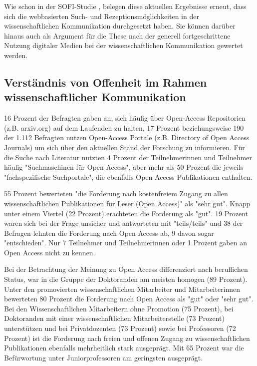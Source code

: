 Wie schon in der SOFI-Studie \cite{Hanekop_2014}, belegen diese aktuellen Ergebnisse erneut, dass sich die webbasierten Such- und Rezeptionsmöglichkeiten in der wissenschaftlichen Kommunikation durchgesetzt haben. Sie können darüber hinaus auch als Argument für die These nach der generell fortgeschrittene Nutzung digitaler Medien bei der wissenschaftlichen Kommunikation gewertet werden.

\subsection{Verständnis von Offenheit im Rahmen wissenschaftlicher Kommunikation}

16 Prozent der Befragten gaben an, sich häufig über Open-Access Repositorien (z.B. arxiv.org) auf dem Laufenden zu halten, 17 Prozent beziehungsweise 190 der 1.112 Befragten nutzen Open-Access Portale (z.B. Directory of Open Access Journals) um sich über den aktuellen Stand der Forschung zu informieren. Für die Suche nach Literatur nutzten 4 Prozent der Teilnehmerinnen und Teilnehmer häufig "Suchmaschinen für Open Access", aber mehr als 50 Prozent die jeweils "fachspezifische Suchportale", die ebenfalls Open-Access Publikationen enthalten.

55 Prozent bewerteten "die Forderung nach kostenfreiem Zugang zu allen wissenschaftlichen Publikationen für Leser (Open Access)" als "sehr gut". Knapp unter einem Viertel (22 Prozent) erachteten die Forderung als "gut". 19 Prozent waren sich bei der Frage unsicher und antworteten mit "teils/teils" und 38 der Befragen lehnten die Forderung nach Open Access ab, 9 davon sogar "entschieden". Nur 7 Teilnehmer und Teilnehmerinnen oder 1 Prozent gaben an Open Access nicht zu kennen.

Bei der Betrachtung der Meinung zu Open Access differenziert nach beruflichen Status, war in die Gruppe der Doktoranden am meisten homogen (89 Prozent). Unter den promovierten wissenschaftlichen Mitarbeiter und Mitarbeiterinnen bewerteten 80 Prozent die Forderung nach Open Access als "gut" oder "sehr gut". Bei den Wissenschaftlichen Mitarbeitern ohne Promotion (75 Prozent), bei Doktoranden mit einer wissenschaftlichen Mitarbeiterstelle (73 Prozent) unterstützen und bei Privatdozenten (73 Prozent) sowie bei Professoren (72 Prozent) ist die Forderung nach freien und offenen Zugang zu wissenschaftlichen Publikationen ebenfalls mehrheitlich stark ausgeprägt. Mit 65 Prozent war die Befürwortung unter Juniorprofessoren am geringsten ausgeprägt.

